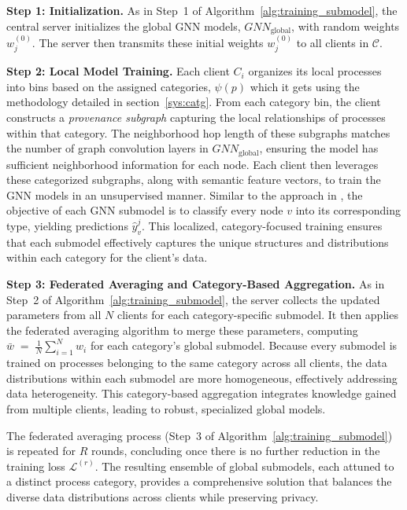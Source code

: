\textbf{Step 1: Initialization.} As in Step~1 of Algorithm~\ref{alg:training_submodel}, the central server initializes the global GNN models, \({GNN}_{\text{global}}\), with random weights \( w_j^{(0)} \). The server then transmits these initial weights \( w_j^{(0)} \) to all clients in \(\mathcal{C}\).

\textbf{Step 2: Local Model Training.} Each client \( C_i \) organizes its local processes into bins based on the assigned categories, \(\psi(p)\) which it gets using the methodology detailed in section~\ref{sys:catg}. From each category bin, the client constructs a \emph{provenance subgraph} capturing the local relationships of processes within that category. The neighborhood hop length of these subgraphs matches the number of graph convolution layers in \({GNN}_{\text{global}}\), ensuring the model has sufficient neighborhood information for each node. Each client then leverages these categorized subgraphs, along with semantic feature vectors, to train the GNN models in an unsupervised manner. Similar to the approach in \flash, the objective of each GNN submodel is to classify every node \(v\) into its corresponding type, yielding predictions \(\hat{y}_v^j\). This localized, category-focused training ensures that each submodel effectively captures the unique structures and distributions within each category for the client’s data.

\textbf{Step 3: Federated Averaging and Category-Based Aggregation.} As in Step~2 of Algorithm~\ref{alg:training_submodel}, the server collects the updated parameters from all \( N \) clients for each category-specific submodel. It then applies the federated averaging algorithm to merge these parameters, computing
\(
\bar{w} \;=\; \frac{1}{N} \sum_{i=1}^{N} w_i
\) for each category’s global submodel. Because every submodel is trained on processes belonging to the same category across all clients, the data distributions within each submodel are more homogeneous, effectively addressing data heterogeneity. This category-based aggregation integrates knowledge gained from multiple clients, leading to robust, specialized global models.

The federated averaging process (Step~3 of Algorithm~\ref{alg:training_submodel}) is repeated for \( R \) rounds, concluding once there is no further reduction in the training loss \(\mathcal{L}^{(r)}\). The resulting ensemble of global submodels, each attuned to a distinct process category, provides a comprehensive solution that balances the diverse data distributions across clients while preserving privacy.

